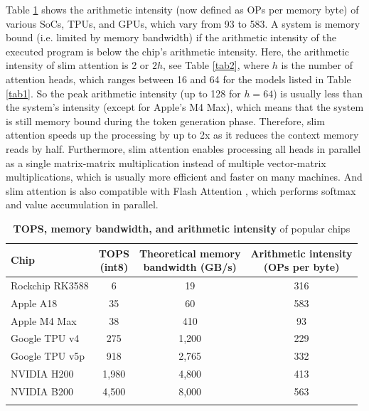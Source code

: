 \documentclass{article}
\def\fline{\Xhline{2\arrayrulewidth}} %
\begin{document}
Table \ref{tab3} shows the arithmetic intensity (now defined as OPs per memory byte) of various SoCs, TPUs, and GPUs, which vary from 93 to 583. A system is memory bound (i.e. limited by memory bandwidth) if the arithmetic intensity of the executed program is below the chip’s arithmetic intensity. Here, the arithmetic intensity of slim attention is 2 or $2h$, see Table \ref{tab2}, where $h$ is the number of attention heads, which ranges between 16 and 64 for the models listed in Table \ref{tab1}. So the peak arithmetic intensity (up to 128 for $h = 64$) is usually less than the system’s intensity (except for Apple's M4 Max), which means that the system is still memory bound during the token generation phase. Therefore, slim attention speeds up the processing by up to 2x as it reduces the context memory reads by half. Furthermore, slim attention enables processing all heads in parallel as a single matrix-matrix multiplication instead of multiple vector-matrix multiplications, which is usually more efficient and faster on many machines. And slim attention is also compatible with Flash Attention \citep{flash-attention}, which performs softmax and value accumulation in parallel.
\begingroup \renewcommand{\arraystretch}{1.3} %
\begin{table}[h!] \centering
\caption{\textbf{TOPS, memory bandwidth, and arithmetic intensity} of popular chips}
\begin{tabular}{lccc} \fline
  Chip & \makecell{TOPS \\ (int8)} & \makecell{Theoretical memory \\ bandwidth (GB/s)} & \makecell{Arithmetic intensity \\ (OPs per byte)} \\ \hline
  Rockchip RK3588 & 6         & 19      & 316 \\
  Apple A18 \citep{apple-wiki}       & 35        & 60      & 583 \\
  Apple M4 Max \citep{apple-wiki}    & 38        & 410     & 93  \\
  Google TPU v4 \citep{TPU-wiki}  & 275       & 1,200   & 229 \\
  Google TPU v5p \citep{TPU-wiki}  & 918       & 2,765   & 332 \\
  NVIDIA H200  \citep{nvidia-wiki}   & 1,980     & 4,800   & 413 \\
  NVIDIA B200 \citep{nvidia-wiki}    & 4,500     & 8,000   & 563 \\ \fline
\end{tabular} \label{tab3} \end{table} \endgroup
\end{document}
